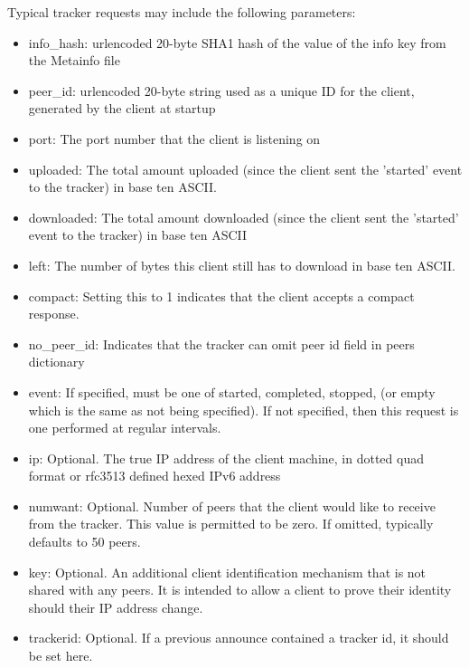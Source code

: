 \documentclass[letter]{scrartcl}
\begin{document}
Typical tracker requests may include the following parameters:
\begin{itemize}
\item info\_hash: urlencoded 20-byte SHA1 hash of the value of the info key from the Metainfo file
\item peer\_id: urlencoded 20-byte string used as a unique ID for the client, generated by the client at startup
\item port: The port number that the client is listening on
\item uploaded: The total amount uploaded (since the client sent the 'started' event to the tracker) in base ten ASCII.
\item downloaded:  The total amount downloaded (since the client sent the 'started' event to the tracker) in base ten ASCII
\item left: The number of bytes this client still has to download in base ten ASCII.
\item compact: Setting this to 1 indicates that the client accepts a compact response.
\item no\_peer\_id: Indicates that the tracker can omit peer id field in peers dictionary
\item event:  If specified, must be one of started, completed, stopped, (or empty which is the same as not being specified). If not specified, then this request is one performed at regular intervals.
\item ip: Optional. The true IP address of the client machine, in dotted quad format or rfc3513 defined hexed IPv6 address
\item numwant: Optional. Number of peers that the client would like to receive from the tracker. This value is permitted to be zero. If omitted, typically defaults to 50 peers.
\item key: Optional. An additional client identification mechanism that is not shared with any peers. It is intended to allow a client to prove their identity should their IP address change.
\item trackerid: Optional. If a previous announce contained a tracker id, it should be set here.
\end{itemize}
\end{document}
